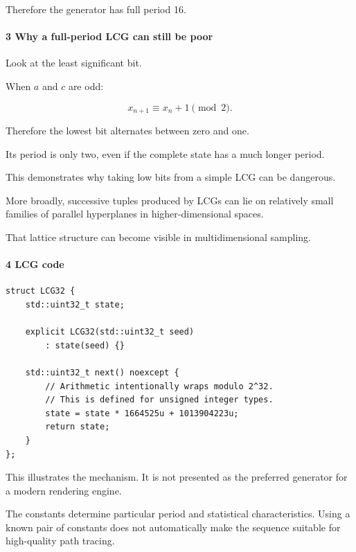 Therefore the generator has full period 16.

\paragraph{3 Why a full-period LCG can still be poor}\label{02-foundations-ii-ch029-why-a-full-period-lcg-can-still-be-poor}

\hypertarget{02-foundations-ii-ch029-why-a-full-period-lcg-can-still-be-poor}{}

Look at the least significant bit.

When \(a\) and \(c\) are odd:

\[
 x_{n+1}\equiv x_n+1\pmod2.
\]

Therefore the lowest bit alternates between zero and one.

Its period is only two, even if the complete state has a much longer period.

This demonstrates why taking low bits from a simple LCG can be dangerous.

More broadly, successive tuples produced by LCGs can lie on relatively small families of parallel hyperplanes in higher-dimensional spaces.

That lattice structure can become visible in multidimensional sampling.

\paragraph{4 LCG code}\label{02-foundations-ii-ch029-lcg-code}

\hypertarget{02-foundations-ii-ch029-lcg-code}{}

\begin{verbatim}
struct LCG32 {
    std::uint32_t state;

    explicit LCG32(std::uint32_t seed)
        : state(seed) {}

    std::uint32_t next() noexcept {
        // Arithmetic intentionally wraps modulo 2^32.
        // This is defined for unsigned integer types.
        state = state * 1664525u + 1013904223u;
        return state;
    }
};
\end{verbatim}

This illustrates the mechanism. It is not presented as the preferred generator for a modern rendering engine.

The constants determine particular period and statistical characteristics. Using a known pair of constants does not automatically make the sequence suitable for high-quality path tracing.

